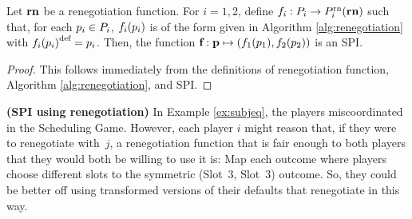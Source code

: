 \documentclass[sigconf]{aamas}
\theoremstyle{definition}
\begin{document}
\begin{proposition}
\label{prop:spi}
Let $\mathbf{rn}$ be a renegotiation function. 
For $i=1,2$, define 
$f_i: P_i \rightarrow P_i^{\textnormal{rn}}(\mathbf{rn})$ such that,
for each $p_i \in P_i$, $f_i(p_i)$
is of the form given in Algorithm 
\ref{alg:renegotiation} with 
${f_i(p_i)}^{\textnormal{def}} = p_i$. Then, the function
$\textbf{f}: \textbf{p} \mapsto (f_1(p_1), f_2(p_2))$ is an SPI.
\end{proposition}
\begin{proof}
This follows immediately from 
the definitions of renegotiation
function, Algorithm 
\ref{alg:renegotiation}, and 
SPI.
\end{proof}

 \begin{exmp}
\label{ex:SPIdemo}
\textbf{(SPI using renegotiation)} 
In Example \ref{ex:subjeq},
the players miscoordinated
in the Scheduling Game.
However, each player $i$ might reason that,
if they were to renegotiate with~$j$, a
renegotiation function
that is fair enough to both players that
they would both be willing to use it is: Map
each outcome where players 
choose different slots
to 
the symmetric
(Slot~3, Slot~3) outcome.
So, they could be better off using transformed versions
of their defaults
that renegotiate in this way.
\end{exmp}


\end{document}
